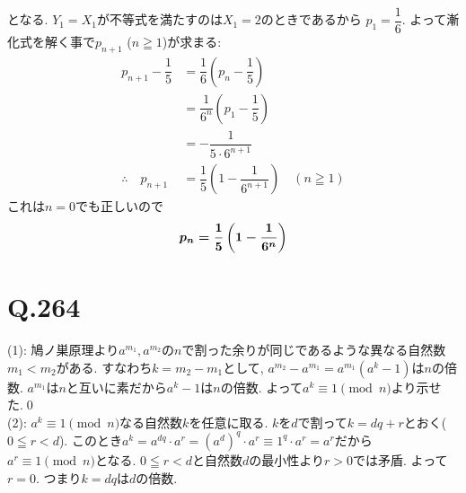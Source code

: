\documentclass[dvipdfmx]{jbook}
\theoremstyle{definition}
\newcommand{\bolm}[1]{{\mbox{\boldmath $#1$}}}
\renewcommand{\leq}{\leqq}
\renewcommand{\geq}{\geqq}
\begin{document}
となる. $Y_1 = X_1$が不等式を満たすのは$X_1 = 2$のときであるから $p_1 = \dfrac{1}{6}$. よって漸化式を解く事で$p_{n+1}$ ($n\geq 1$)が求まる: 
\begin{align*}
p_{n+1} - \dfrac{1}{5} &= \dfrac{1}{6} \left( p_n - \dfrac{1}{5}\right) \\
&= \dfrac{1}{6^n} \left(p_1 - \dfrac{1}{5} \right) \\
&= -\dfrac{1}{5\cdot 6^{n+1}} \\
\therefore \quad p_{n+1} &= \dfrac{1}{5} \left( 1 - \dfrac{1}{6^{n+1} } \right) \quad (n\geq 1)
\end{align*}
これは$n=0$でも正しいので
\[\bolm{p_n = \dfrac{1}{5} \left( 1 - \dfrac{1}{6^n} \right) }\]



\section{Q.264}
(1): 鳩ノ巣原理より$a^{m_1},a^{m_2}$の$n$で割った余りが同じであるような異なる自然数$m_1<m_2$がある. すなわち$k=m_2-m_1$として, $a^{m_2} - a^{m_1} = a^{m_1}(a^k - 1)$は$n$の倍数. $a^{m_1}$は$n$と互いに素だから$a^k - 1$は$n$の倍数. よって$a^k \equiv 1\pmod{n}$より示せた.\qed \\
(2): $a^k\equiv 1\pmod{n}$なる自然数$k$を任意に取る. $k$を$d$で割って$k=dq + r$とおく($0\leq r<d$). このとき$a^{k} = a^{dq}\cdot a^r = (a^{d})^q \cdot a^r \equiv 1^q\cdot a^r = a^r$だから$a^r \equiv 1\pmod{n}$となる. $0\leq r<d$と自然数$d$の最小性より$r>0$では矛盾. よって$r=0$. つまり$k=dq$は$d$の倍数. 



\clearpage 
\end{document}
